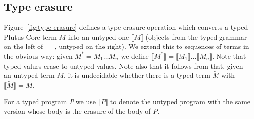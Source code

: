 \documentclass[a4paper]{article}
\newcommand{\erase}[1]{\llbracket#1\rrbracket}
\begin{document}
\subsection{Type erasure}
Figure~\ref{fig:type-erasure} defines a type erasure operation which
converts a typed Plutus Core term $M$ into an untyped one $\erase{M}$
(objects from the typed grammar on the left of $=$, untyped on the
right).  We extend this to sequences of terms in the obvious way:
given $M^* = M_1 \ldots M_n$ we define $\erase{M^*}
= \erase{M_1} \ldots \erase{M_n}$.  Note that typed values erase to
untyped values.  Note also that it follows
from \cite{Wells-96-typability} that, given an untyped term $M$, it is
undecidable whether there is a typed term $\widetilde{M}$ with $\erase{\widetilde{M}} = M$.

For a typed program $P$ we use $\erase{P}$ to denote the untyped
program with the same version whose body is the erasure of the body of
$P$.




\end{document}

